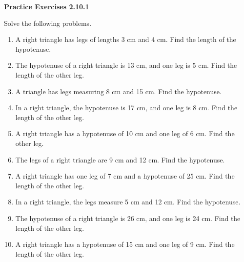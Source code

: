  \vspace{1ex}
\noindent\textbf{Practice Exercises 2.10.1}


Solve the following problems. 
\begin{enumerate}[noitemsep, label = \color{blue}\arabic*. ]    \item A right triangle has legs of lengths 3 cm and 4 cm. Find the length of the hypotenuse.
    \item The hypotenuse of a right triangle is 13 cm, and one leg is 5 cm. Find the length of the other leg.
    \item A triangle has legs measuring 8 cm and 15 cm. Find the hypotenuse.
    \item In a right triangle, the hypotenuse is 17 cm, and one leg is 8 cm. Find the length of the other leg.
    \item A right triangle has a hypotenuse of 10 cm and one leg of 6 cm. Find the other leg.
    \item The legs of a right triangle are 9 cm and 12 cm. Find the hypotenuse.
    \item A right triangle has one leg of 7 cm and a hypotenuse of 25 cm. Find the length of the other leg.
    \item In a right triangle, the legs measure 5 cm and 12 cm. Find the hypotenuse.
    \item The hypotenuse of a right triangle is 26 cm, and one leg is 24 cm. Find the length of the other leg.
    \item A right triangle has a hypotenuse of 15 cm and one leg of 9 cm. Find the length of the other leg.
\end{enumerate}
